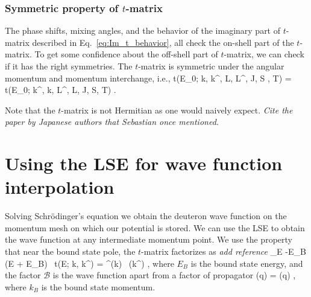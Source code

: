   \subsubsection{Symmetric property of $t$-matrix}

  The phase shifts, mixing angles, and the behavior of the imaginary part of
  $t$-matrix described in Eq.~\eqref{eq:Im_t_behavior}, all check the
  on-shell part of the $t$-matrix.  To get some confidence about the off-shell
  part of $t$-matrix, we can check if it has the right symmetries.
  The $t$-matrix is symmetric under the angular momentum and momentum
  interchange, i.e.,
  \beq
  t(E_0; k, k^\prime, L, L^\prime, J, S , T) = t(E_0; k^\prime, k, L^\prime, L,
  J, S, T) \;.
  \eeq

  Note that the $t$-matrix is not Hermitian as one would naively expect.
  \emph{Cite the paper by Japanese authors that Sebastian once mentioned.}

  \section{Using the LSE for wave function interpolation}

  Solving Schr\"{o}dinger's equation we obtain the deuteron wave function
  on the momentum mesh on which our potential is stored.  We can use the LSE
  to obtain the wave function at any intermediate momentum point.
  We use the property that near the bound state pole, the $t$-matrix
  factorizes as \emph{add reference}
  \beq
  \lim_{E \to -E_B} (E + E_B) \, t(E; k, k^\prime) = ^\ast (k) \,
   (k^\prime) \;,
  \label{eq:t_near_pole}
  \eeq
  where $E_B$ is the bound state energy, and the factor $\mathcal{B}$ is
  the wave function apart from a factor of propagator
  \beq
  (q) =  \psi(q) \;,
  \label{eq:B_psi_relation}
  \eeq
  where $k_B$ is the bound state momentum.

